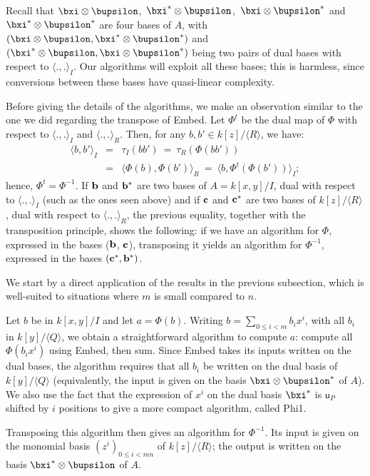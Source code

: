 \documentclass{sig-alternate}
\def\vu {\ensuremath{\mathsf{u}}}
\newcounter{algo}
\newcommand{\ang}[1]{\langle#1\rangle}
\begin{document}
Recall that $\bxi \otimes \bupsilon$,\ $\bxi^\ast \otimes
\bupsilon$,\ $\bxi \otimes \bupsilon^\ast$ and $\bxi^\ast \otimes
\bupsilon^\ast$ are four bases of $A$, with $(\bxi \otimes \bupsilon,
\bxi^\ast \otimes \bupsilon^\ast)$ and $(\bxi^\ast \otimes \bupsilon,
\bxi \otimes \bupsilon^\ast)$ being two pairs of dual bases with
respect to $\ang{.,.}_I$. Our algorithms will exploit all these bases;
this is harmless, since conversions between these bases have
quasi-linear complexity.

Before giving the details of the algorithms, we make an observation
similar to the one we did regarding the transpose of {\sf Embed}. Let
$\Phi^t$ be the dual map of $\Phi$ with respect to $\ang{.,.}_I$ and
$\ang{.,.}_R$. Then, for any $b,b' \in k[z]/\ang{R}$, we have:
\begin{eqnarray*}
\ang{b,b'}_I&=&\tau_I(b b') ~=~  \tau_R(\Phi(b b'))\\
&=& \ang{\Phi(b), \Phi(b')}_R ~=~  \ang{b, \Phi^t(\Phi(b'))}_I;
\end{eqnarray*}
hence, $\Phi^t = \Phi^{-1}$. If ${\bf b}$ and ${\bf b}^\ast$ are two
bases of $A=k[x,y]/I$, dual with respect to $\ang{.,.}_I$ (such as the
ones seen above) and if ${\bf c}$ and ${\bf c}^\ast$ are two bases of
$k[z]/\ang{R}$, dual with respect to $\ang{.,.}_R$, the previous
equality, together with the transposition principle, shows the
following: if we have an algorithm for $\Phi$, expressed in the bases
(${\bf b}$, ${\bf c}$), transposing it yields an algorithm for
$\Phi^{-1}$, expressed in the bases $({\bf c}^\ast,{\bf b}^\ast)$.

\smallskip{}
We start by a direct application of the results in the previous
subsection, which is well-suited to situations where $m$ is small
compared to $n$.

Let $b$ be in $k[x,y]/I$ and let $a=\Phi(b)$. Writing $b=\sum_{0 \le i
  < m} b_i x^i$, with all $b_i$ in $k[y]/\ang{Q}$, we obtain a
straightforward algorithm to compute $a$: compute all $\Phi(b_i x^i)$
using {\sf Embed}, then sum. Since {\sf Embed} takes its inputs
written on the dual bases, the algorithm requires that all $b_i$
be written on the dual basis of $k[y]/\ang{Q}$ (equivalently, the
input is given on the basis $\bxi \otimes \bupsilon^\ast$ of $A$). We
also use the fact that the expression of $x^i$ on the dual
basis $\bxi^\ast$ is $\vu_P$ shifted by $i$ positions to give a
 more compact algorithm, called {\sf Phi1}.

Transposing this algorithm then gives an algorithm for
$\Phi^{-1}$. Its input is given on the monomial basis $(z^i)_{0 \le i
  < mn}$ of $k[z]/\ang{R}$; the output is written on the basis
$\bxi^\ast \otimes \bupsilon$ of $A$.
\end{document}
